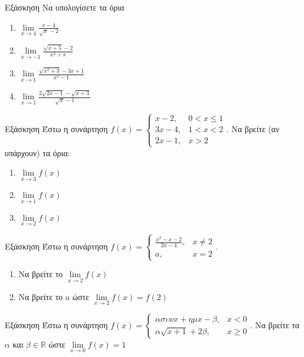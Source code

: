 \documentclass[greek]{beamer}
\begin{document}
\begin{frame}{Εξάσκηση}
 Να υπολογίσετε τα όρια
 \begin{enumerate}
  \item $\lim\limits_{x \to 4}{ \frac{x-4}{\sqrt{x}-2} }$ \pause
  \item $\lim\limits_{x \to -1}{ \frac{\sqrt{x+5}-2}{x^2+x} }$ \pause
  \item $\lim\limits_{x \to 1}{ \frac{\sqrt{x^2+3}-3x+1}{x^2-1} }$ \pause
  \item $\lim\limits_{x \to 1}{ \frac{2\sqrt{2x-1}-\sqrt{x+3}}{\sqrt{x}-1} }$
 \end{enumerate}
\end{frame}

\begin{frame}{Εξάσκηση}
 Έστω η συνάρτηση $f(x)=\begin{cases}
   x-2,  & 0<x\le 1 \\
   3x-4, & 1<x<2    \\
   2x-1, & x>2
  \end{cases}$.
 Να βρείτε (αν υπάρχουν) τα όρια:
 \begin{enumerate}
  \item $\lim\limits_{x \to 3}{ f(x) }$ \pause
  \item $\lim\limits_{x \to 1}{ f(x) }$ \pause
  \item $\lim\limits_{x \to 2}{ f(x) }$
 \end{enumerate}
\end{frame}

\begin{frame}{Εξάσκηση}
 Έστω η συνάρτηση $f(x)=\begin{cases}
   \frac{x^2-x-2}{2x-4}, & x\ne 2 \\
   a,                    & x=2
  \end{cases}$.
 \begin{enumerate}
  \item Να βρείτε το $\lim\limits_{x \to 2}{ f(x) }$ \pause
  \item Να βρείτε το $a$ ώστε $\lim\limits_{x \to 2}{ f(x) }=f(2)$
 \end{enumerate}
\end{frame}

\begin{frame}{Εξάσκηση}
 Έστω η συνάρτηση $f(x)=\begin{cases}
   ασυνx+ημx-β,    & x<0    \\
   α\sqrt{x+1}+2β, & x\ge 0
  \end{cases}$.
 Να βρείτε τα $α$ και $β\in\mathbb{R}$ ώστε $\lim\limits_{x \to 0}{ f(x) }=1$
\end{frame}
\end{document}

